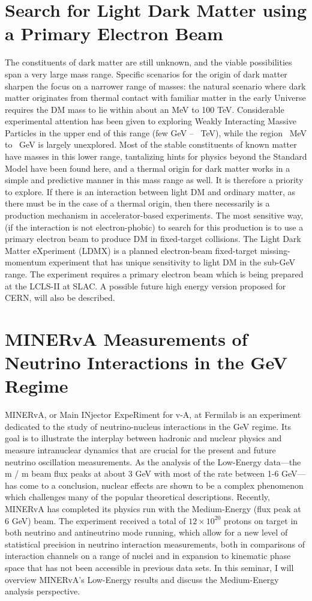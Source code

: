 \documentclass[12pt, a4paper, notitlepage, onecolumn]{article}
\begin{document}
\section{Search for Light Dark Matter using a Primary Electron Beam}
\noindent The constituents of dark matter are still unknown, and the viable possibilities span a very large mass range. Specific scenarios for the origin of dark matter sharpen the focus on a narrower range of masses: the natural scenario where dark matter originates from thermal contact with familiar matter in the early Universe requires the DM mass to lie within about an MeV to 100 TeV. Considerable experimental attention has been given to exploring Weakly Interacting Massive Particles in the upper end of this range (few GeV – ~TeV), while the region ~MeV to ~GeV is largely unexplored. Most of the stable constituents of known matter have masses in this lower range, tantalizing hints for physics beyond the Standard Model have been found here, and a thermal origin for dark matter works in a simple and predictive manner in this mass range as well. It is therefore a priority to explore. If there is an interaction between light DM and ordinary matter, as there must be in the case of a thermal origin, then there necessarily is a production mechanism in accelerator-based experiments. The most sensitive way, (if the interaction is not electron-phobic) to search for this production is to use a primary electron beam to produce DM in fixed-target collisions. The Light Dark Matter eXperiment (LDMX) is a planned electron-beam fixed-target missing-momentum experiment that has unique sensitivity to light DM in the sub-GeV range. The experiment requires a primary electron beam which is being prepared at the LCLS-II at SLAC. A possible future high energy version proposed for CERN, will also be described.

\section{MINERvA Measurements of Neutrino Interactions in the GeV Regime}
\noindent MINERvA, or Main INjector ExpeRiment for v-A, at Fermilab is an experiment dedicated to the study of neutrino-nucleus interactions in the GeV regime. Its goal is to illustrate the interplay between hadronic and nuclear physics and measure intranuclear dynamics that are crucial for the present and future neutrino oscillation measurements. As the analysis of the Low-Energy data—the  m / m  beam flux peaks at about 3 GeV with most of the rate between 1-6 GeV—has come to a conclusion, nuclear effects are shown to be a complex phenomenon which challenges many of the popular theoretical descriptions. Recently, MINERvA has completed its physics run with the Medium-Energy (flux peak at 6 GeV) beam. The experiment received a total of $12\times 10^{20}$ protons on target in both neutrino and antineutrino mode running, which allow for a new level of statistical precision in neutrino interaction measurements, both in comparisons of interaction channels on a range of nuclei and in expansion to kinematic phase space that has not been accessible in previous data sets. In this seminar, I will overview MINERvA’s Low-Energy results and discuss the Medium-Energy analysis perspective.
\end{document}
